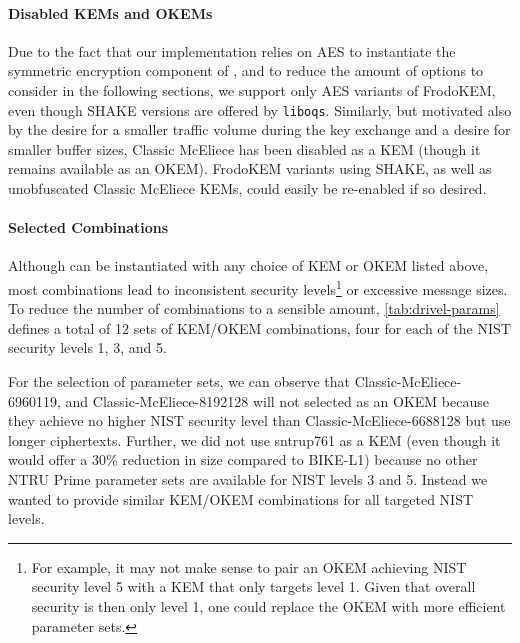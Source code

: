 \paragraph{Disabled KEMs and OKEMs}

Due to the fact that our implementation relies on AES to instantiate the symmetric encryption component of \drivel{}, and to reduce the amount of options to consider in the following sections, we support only AES variants of FrodoKEM, even though SHAKE versions are offered by \texttt{liboqs}.
Similarly, but motivated also by the desire for a smaller traffic volume during the key exchange and a desire for smaller buffer sizes, Classic McEliece has been disabled as a KEM (though it remains available as an OKEM).
FrodoKEM variants using SHAKE, as well as unobfuscated Classic McEliece KEMs, could easily be re-enabled if so desired.

\paragraph{Selected Combinations}

Although \drivel{} can be instantiated with any choice of KEM or OKEM listed above, most combinations lead to inconsistent security levels\footnote{For example, it may not make sense to pair an OKEM achieving NIST security level 5 with a KEM that only targets level 1. Given that overall security is then only level 1, one could replace the OKEM with more efficient parameter sets.} or excessive message sizes. To reduce the number of combinations to a sensible amount, \cref{tab:drivel-params} defines a total of 12 sets of KEM/OKEM combinations, four for each of the NIST security levels 1, 3, and 5.

For the selection of parameter sets, we can observe that Classic-McEliece-6960119, and Classic-McEliece-8192128 will not selected as an OKEM because they achieve no higher NIST security level than Classic-McEliece-6688128 but use longer ciphertexts.
Further, we did not use sntrup761 as a KEM (even though it would offer a 30\% reduction in size compared to BIKE-L1) because no other NTRU Prime parameter sets are available for NIST levels 3 and 5. Instead we wanted to provide similar KEM/OKEM combinations for all targeted NIST levels.

